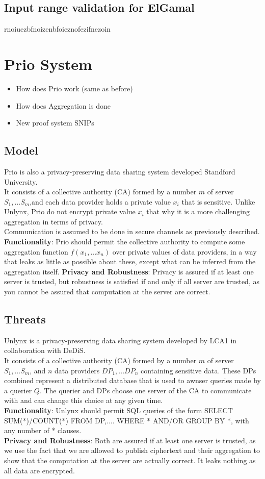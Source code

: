 \documentclass{article}
\begin{document}
\subsection{Input range validation for ElGamal}

rnoiuezbfnoizenbfoieznofezifnezoin


\section{Prio System}
\begin{itemize}
\item How does Prio work (same as before)
\item How does Aggregation is done
\item New proof system SNIPs
\end{itemize}
\subsection{Model}
Prio is also a privacy-preserving data sharing system developed Standford University.\\
It consists of a collective authority (CA) formed by a number $m$ of server $S_1,...S_m$,and each data provider holds a private value $x_i$ that is sensitive. 
Unlike Unlynx, Prio do not encrypt private value $x_i$ that why it is a more challenging aggregation in terms of privacy.\\
Communication is assumed to be done in secure channels as previously described.
\textbf{Functionality}: Prio should permit the collective authority to compute some aggregation function $f(x_1,...x_n)$ over private values of data providers, in a way that leaks as little as possible about these, except what can be inferred from the aggregation itself.
\textbf{Privacy and Robustness}: Privacy is assured if at least one server is trusted, but robustness is satisfied if and only if all server are trusted, as you cannot be assured that computation at the server are correct.	
\
\subsection{Threats}
Unlynx is a privacy-preserving data sharing system developed by LCA1 in collaboration with DeDiS.\\
It consists of a collective authority (CA) formed by a number $m$ of server $S_1,...S_m$, and $n$ data providers $DP_1,...DP_n$ containing sensitive data. These DPs combined represent a distributed database that is used to awnser queries made by a querier $Q$. The querier and DPs choose one server of the CA to communicate with and can change this choice at any given time.\\
\textbf{Functionality}: Unlynx should permit SQL queries of the form SELECT SUM(*)/COUNT(*) FROM DP,.... WHERE * AND/OR GROUP BY *, with any number of * clauses.\\
\textbf{Privacy and Robustness}: Both are assured if at least one server is trusted, as we use the fact that we are allowed to publish ciphertext and their aggregation to show that the computation at the server are actually correct. It leaks nothing as all data are encrypted.
\end{document}
